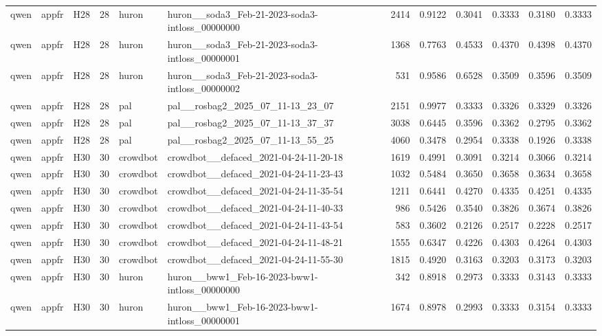 \begin{table}[tbp]
\begin{tabular}{lllrllrrrrrr}
qwen & appfr & H28 & 28 & huron & huron\_\_soda3\_Feb-21-2023-soda3-intloss\_00000000 & 2414 & 0.9122 & 0.3041 & 0.3333 & 0.3180 & 0.3333 \\
qwen & appfr & H28 & 28 & huron & huron\_\_soda3\_Feb-21-2023-soda3-intloss\_00000001 & 1368 & 0.7763 & 0.4533 & 0.4370 & 0.4398 & 0.4370 \\
qwen & appfr & H28 & 28 & huron & huron\_\_soda3\_Feb-21-2023-soda3-intloss\_00000002 & 531 & 0.9586 & 0.6528 & 0.3509 & 0.3596 & 0.3509 \\
qwen & appfr & H28 & 28 & pal & pal\_\_rosbag2\_2025\_07\_11-13\_23\_07 & 2151 & 0.9977 & 0.3333 & 0.3326 & 0.3329 & 0.3326 \\
qwen & appfr & H28 & 28 & pal & pal\_\_rosbag2\_2025\_07\_11-13\_37\_37 & 3038 & 0.6445 & 0.3596 & 0.3362 & 0.2795 & 0.3362 \\
qwen & appfr & H28 & 28 & pal & pal\_\_rosbag2\_2025\_07\_11-13\_55\_25 & 4060 & 0.3478 & 0.2954 & 0.3338 & 0.1926 & 0.3338 \\
qwen & appfr & H30 & 30 & crowdbot & crowdbot\_\_defaced\_2021-04-24-11-20-18 & 1619 & 0.4991 & 0.3091 & 0.3214 & 0.3066 & 0.3214 \\
qwen & appfr & H30 & 30 & crowdbot & crowdbot\_\_defaced\_2021-04-24-11-23-43 & 1032 & 0.5484 & 0.3650 & 0.3658 & 0.3634 & 0.3658 \\
qwen & appfr & H30 & 30 & crowdbot & crowdbot\_\_defaced\_2021-04-24-11-35-54 & 1211 & 0.6441 & 0.4270 & 0.4335 & 0.4251 & 0.4335 \\
qwen & appfr & H30 & 30 & crowdbot & crowdbot\_\_defaced\_2021-04-24-11-40-33 & 986 & 0.5426 & 0.3540 & 0.3826 & 0.3674 & 0.3826 \\
qwen & appfr & H30 & 30 & crowdbot & crowdbot\_\_defaced\_2021-04-24-11-43-54 & 583 & 0.3602 & 0.2126 & 0.2517 & 0.2228 & 0.2517 \\
qwen & appfr & H30 & 30 & crowdbot & crowdbot\_\_defaced\_2021-04-24-11-48-21 & 1555 & 0.6347 & 0.4226 & 0.4303 & 0.4264 & 0.4303 \\
qwen & appfr & H30 & 30 & crowdbot & crowdbot\_\_defaced\_2021-04-24-11-55-30 & 1815 & 0.4920 & 0.3163 & 0.3203 & 0.3173 & 0.3203 \\
qwen & appfr & H30 & 30 & huron & huron\_\_bww1\_Feb-16-2023-bww1-intloss\_00000000 & 342 & 0.8918 & 0.2973 & 0.3333 & 0.3143 & 0.3333 \\
qwen & appfr & H30 & 30 & huron & huron\_\_bww1\_Feb-16-2023-bww1-intloss\_00000001 & 1674 & 0.8978 & 0.2993 & 0.3333 & 0.3154 & 0.3333 \\

\end{tabular}
\end{table}
